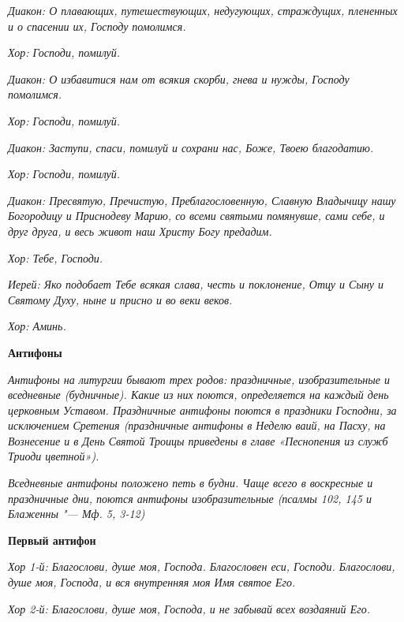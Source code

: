\itshape Диакон:\normalfont{} О плавающих, путешествующих, недугующих, страждущих, плененных и о спасении их, Господу помолимся.


\itshape Хор:\normalfont{} Господи, помилуй.


\itshape Диакон:\normalfont{} О избавитися нам от всякия скорби, гнева и нужды, Господу помолимся.


\itshape Хор:\normalfont{} Господи, помилуй.


\itshape Диакон:\normalfont{} Заступи, спаси, помилуй и сохрани нас, Боже, Твоею благодатию.


\itshape Хор:\normalfont{} Господи, помилуй.


\itshape Диакон:\normalfont{} Пресвятую, Пречистую, Преблагословенную, Славную Владычицу нашу Богородицу и Приснодеву Марию, со всеми святыми помянувше, сами себе, и друг друга, и весь живот наш Христу Богу предадим.


\itshape Хор:\normalfont{} Тебе, Господи.


\itshape Иерей:\normalfont{} Яко подобает Тебе всякая слава, честь и поклонение, Отцу и Сыну и Святому Духу, ныне и присно и во веки веков.


\itshape Хор:\normalfont{} Аминь.





\bfseries Антифоны\normalfont{}


\itshape Антифоны на литургии бывают трех родов: праздничные, изобразительные и вседневные (будничные). Какие из них поются, определяется на каждый день церковным Уставом. Праздничные антифоны поются в праздники Господни, за исключением Сретения (праздничные антифоны в Неделю ваий, на Пасху, на Вознесение и в День Святой Троицы приведены в главе «Песнопения из служб Триоди цветной»).\normalfont{}


\itshape Вседневные антифоны положено петь в будни. Чаще всего в воскресные и праздничные дни, поются антифоны изобразительные (псалмы 102, 145 и Блаженны "--- Мф. 5, 3-12)\normalfont{}





\bfseries Первый антифон\normalfont{}


\itshape Хор 1-й:\normalfont{} Благослови, душе моя, Господа. Благословен еси, Господи. Благослови, душе моя, Господа, и вся внутренняя моя Имя святое Его.


\itshape Хор 2-й:\normalfont{} Благослови, душе моя, Господа, и не забывай всех воздаяний Его.


